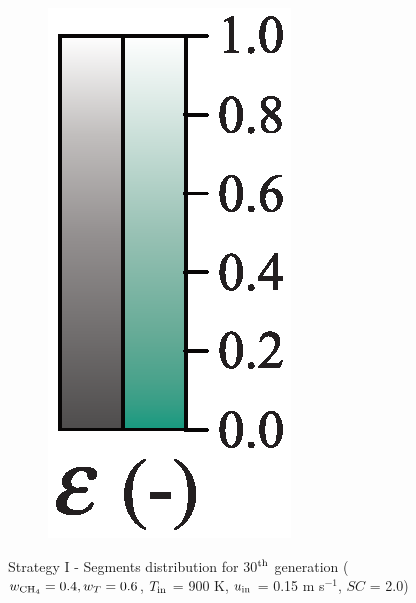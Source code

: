 \documentclass[preprint,12pt]{elsarticle}
\begin{document}
\begin{figure}[h!]
\begin{subfigure}[b]{0.1\textwidth}
     	\includegraphics[width=\textwidth]{segments_porosity.eps}
     \end{subfigure}
\caption{\label{fig:30L4060-seg} Strategy I - Segments distribution for 30$^{\rm{th}}$ generation ($w_{\rm{CH_4}} = 0.4, w_T = 0.6$, $T_{\rm{in}}$ = 900 K, $u_{\rm{in}}$ = 0.15 m s$^{-1}$, $SC$ = 2.0)}
\end{figure}
\end{document}
